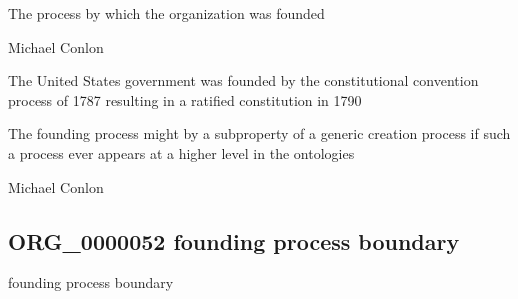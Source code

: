 \documentclass[letterpaper,10pt,english]{sphinxmanual}
\begin{document}
\begin{sphinxShadowBox}

\sphinxAtStartPar
The process by which the organization was founded
\end{sphinxShadowBox}

\begin{sphinxShadowBox}

\sphinxAtStartPar
Michael Conlon 
\end{sphinxShadowBox}

\begin{sphinxShadowBox}

\sphinxAtStartPar
The United States government was founded by the constitutional convention process of 1787 resulting in a ratified constitution in 1790
\end{sphinxShadowBox}

\begin{sphinxShadowBox}

\sphinxAtStartPar
The founding process might by a subproperty of a generic creation process if such a process ever appears at a higher level in the ontologies
\end{sphinxShadowBox}

\begin{sphinxShadowBox}

\sphinxAtStartPar
Michael Conlon 
\end{sphinxShadowBox}
\begin{quote}

\ignorespaces \end{quote}


\subsection{ORG\_0000052 \sphinxhyphen{} founding process boundary}
\label{\detokenize{doc-ORG_0000052:org-0000052-founding-process-boundary}}\label{\detokenize{doc-ORG_0000052:index-0}}\label{\detokenize{doc-ORG_0000052::doc}}
\begin{sphinxShadowBox}

\sphinxAtStartPar
founding process boundary
\end{sphinxShadowBox}
\end{document}

